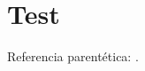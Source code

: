 \documentclass{ui1activity}
\begin{document}
\section{Test}
Referencia parentética: \parencite{et2015}.
\makebibliography
\end{document}
